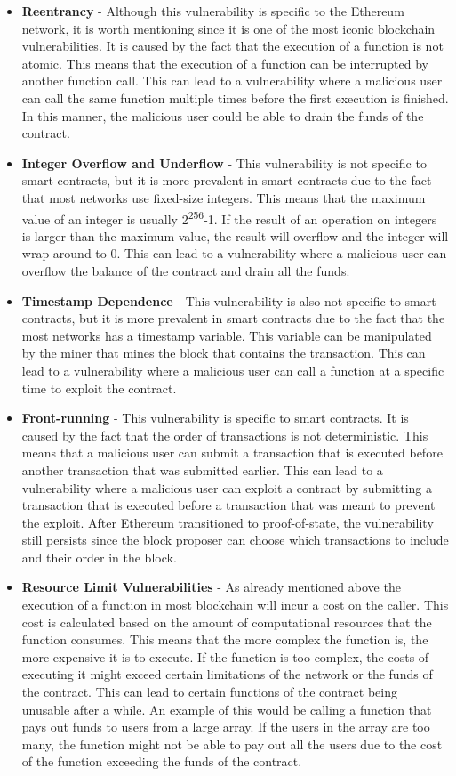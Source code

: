\begin{itemize}
    \item \textbf{Reentrancy} - Although this vulnerability is specific to the Ethereum network, it is worth mentioning since it is one of the most iconic blockchain vulnerabilities. It is caused by the fact that the execution of a function is not atomic. This means that the execution of a function can be interrupted by another function call. This can lead to a vulnerability where a malicious user can call the same function multiple times before the first execution is finished. In this manner, the malicious user could be able to drain the funds of the contract.
    \item \textbf{Integer Overflow and Underflow} - This vulnerability is not specific to smart contracts, but it is more prevalent in smart contracts due to the fact that most networks use fixed-size integers. This means that the maximum value of an integer is usually 2\textsuperscript{256}-1. If the result of an operation on integers is larger than the maximum value, the result will overflow and the integer will wrap around to 0. This can lead to a vulnerability where a malicious user can overflow the balance of the contract and drain all the funds.
    \item \textbf{Timestamp Dependence} - This vulnerability is also not specific to smart contracts, but it is more prevalent in smart contracts due to the fact that the most networks has a timestamp variable. This variable can be manipulated by the miner that mines the block that contains the transaction. This can lead to a vulnerability where a malicious user can call a function at a specific time to exploit the contract.
    \item \textbf{Front-running} - This vulnerability is specific to smart contracts. It is caused by the fact that the order of transactions is not deterministic. This means that a malicious user can submit a transaction that is executed before another transaction that was submitted earlier. This can lead to a vulnerability where a malicious user can exploit a contract by submitting a transaction that is executed before a transaction that was meant to prevent the exploit. After Ethereum transitioned to proof-of-state, the vulnerability still persists since the block proposer can choose which transactions to include and their order in the block.
    \item \textbf{Resource Limit Vulnerabilities} - As already mentioned above the execution of a function in most blockchain will incur a cost on the caller. This cost is calculated based on the amount of computational resources that the function consumes. This means that the more complex the function is, the more expensive it is to execute. If the function is too complex, the costs of executing it might exceed certain limitations of the network or the funds of the contract. This can lead to certain functions of the contract being unusable after a while. An example of this would be calling a function that pays out funds to users from a large array. If the users in the array are too many, the function might not be able to pay out all the users due to the cost of the function exceeding the funds of the contract.

\end{itemize}
